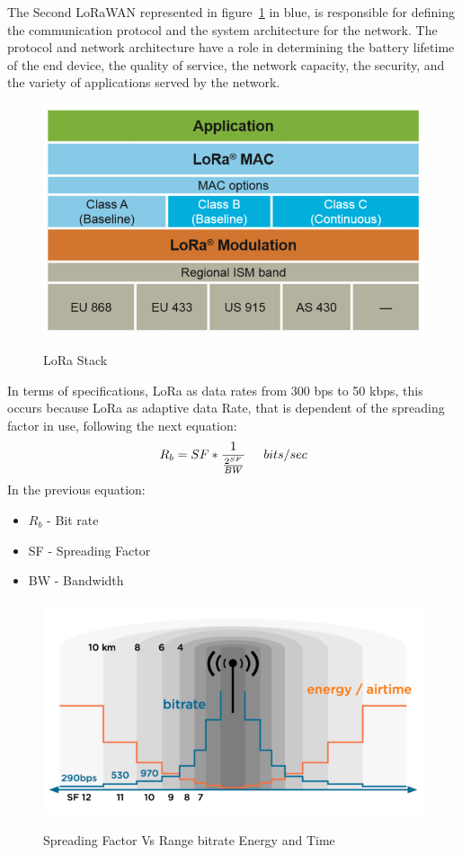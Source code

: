 The Second LoRaWAN represented in figure~\ref{fig:lora_intro} in blue, is responsible for defining the communication protocol and the system architecture for the network. The protocol and network architecture have a role in determining the battery lifetime of the end device, the quality of service, the network capacity, the security, and the variety of applications served by the network.

\begin{figure}[htbp]
  \centering
    {\includegraphics[width=0.6\linewidth]{Chapters/Figures/introlora.PNG}}%
  \caption{LoRa Stack~\cite{What_is_LoRa}}
  \label{fig:lora_intro}
\end{figure}

In terms of specifications, LoRa as data rates from 300 bps to 50 kbps, this occurs because LoRa as adaptive data Rate, that is dependent of the spreading factor in use, following the next equation:
\begin{equation}
    \label{eq:Modulation_Bit_Rate}
        R_b = SF *  \frac{1}{\frac{2^{SF}}{BW}}\hspace{5mm} bits/sec
\end{equation}
In the previous equation:
\begin{itemize}
	\item {$R_b$} - Bit rate
	\item SF - Spreading Factor 
	\item  BW - Bandwidth

\end{itemize} 
\begin{figure}[htbp]
  \centering
    {\includegraphics[width=0.5\linewidth]{Chapters/Figures/LoRa-bitrate-timeonair-04-01.png}}%
  \caption{Spreading Factor Vs Range bitrate Energy and Time }
  \label{fig:lora_sf}
\end{figure}


